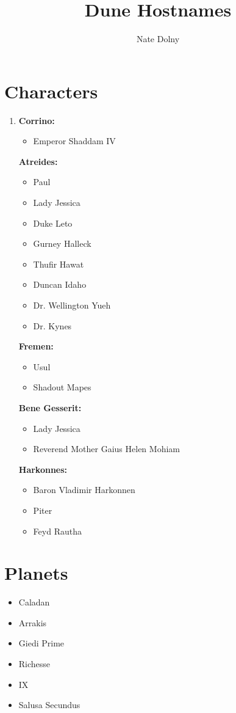 \documentclass{article}
\title{\textbf{Dune Hostnames}}
\author{Nate Dolny}
\date{}
\begin{document}
\maketitle

\section{Characters}
\begin{enumerate}

\item[] \textbf{Corrino:}
\begin{itemize}
\item Emperor Shaddam IV
\end{itemize}


\textbf{Atreides:}
\begin{itemize}
\item Paul
\item Lady Jessica
\item Duke Leto
\item Gurney Halleck 
\item Thufir Hawat
\item Duncan Idaho 
\item Dr. Wellington Yueh
\item Dr. Kynes 
\end{itemize}


\textbf{Fremen:}
\begin{itemize}
\item Usul
\item Shadout Mapes
\end{itemize}


\textbf{Bene Gesserit:}
\begin{itemize}
\item Lady Jessica
\item Reverend Mother Gaius Helen Mohiam
\end{itemize}


\textbf{Harkonnes:}
\begin{itemize}
\item Baron Vladimir Harkonnen 
\item Piter
\item Feyd Rautha
\end{itemize}

\end{enumerate}

\section{Planets}
\begin{itemize}
\item Caladan 
\item Arrakis
\item Giedi Prime
\item Richesse
\item IX
\item Salusa Secundus
\end{itemize}
\end{document}
